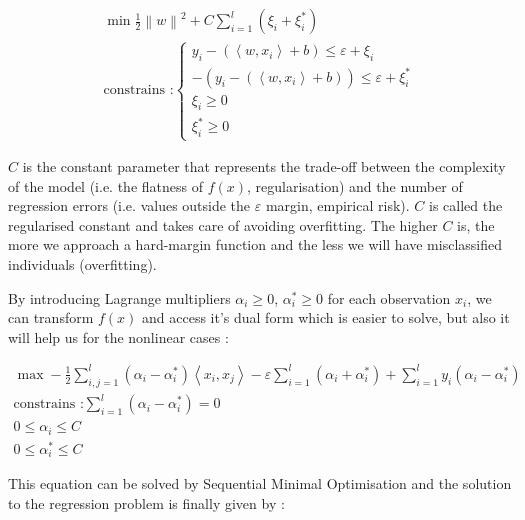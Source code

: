 \documentclass[11pt,a4paper,oneside]{book}
\begin{document}
\begin{equation}
\begin{matrix}
\min \frac{1}{2} \left \| w \right \|^{2} + C\sum_{i=1}^{l}(\xi_{i}+\xi_{i}^*)\\
\text{constrains :}
\left\{\begin{matrix}
y_{i} - (\left \langle w, x_{i} \right \rangle + b)\leq \varepsilon + \xi_{i}\\ 
-(y_{i} - (\left \langle w, x_{i} \right \rangle + b))\leq \varepsilon + \xi_{i}^*\\ 
\xi_{i} \geq 0\\ 
\xi_{i}^*\geq 0
\end{matrix}\right. 
\end{matrix}
\end{equation}


$C$ is the constant parameter that represents the trade-off between the complexity of the model (i.e. the flatness of $f\left ( x \right )$, regularisation) and the number of regression errors (i.e. values outside the $\varepsilon$ margin, empirical risk). $C$ is called the regularised constant and takes care of avoiding overfitting. The higher $C$ is, the more we approach a hard-margin function and the less we will have misclassified individuals (overfitting).


By introducing Lagrange multipliers $\alpha_i \geq 0$, $\alpha_i^*\geq 0$ for each observation $x_i$, we can transform  $f\left ( x \right )$ and access it's dual form which is easier to solve, but also it will help us for the nonlinear cases \cite{Cortes}\cite{Smola} : 


\begin{equation}
\begin{matrix}
\max -\frac{1}{2} \sum_{i,j = 1}^l \left ( \alpha _i - \alpha _i^* \right )\left \langle x_i, x_j \right \rangle - \varepsilon\sum_{i=1}^l\left ( \alpha _i + \alpha _i^* \right ) + \sum_{i=1}^l y_i\left ( \alpha _i - \alpha _i^* \right )\\
\text{constrains :}
\sum_{i=1}^l \left ( \alpha _i - \alpha _i^* \right) = 0 \\
0 \leq \alpha _i \leq C \\
0 \leq \alpha _i^* \leq C
\end{matrix}
\end{equation}


This equation can be solved by Sequential Minimal Optimisation and the solution to the regression problem is finally given by \cite{Cortes}\cite{Smola}:
\end{document}
